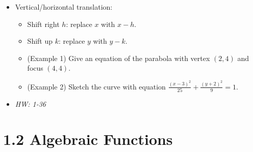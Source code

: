\documentclass[11pt]{article}
\begin{document}
\begin{itemize}
  \item Vertical/horizontal translation:
    \begin{itemize}
      \item Shift right \(h\): replace \(x\) with \(x-h\).
      \item Shift up \(k\): replace \(y\) with \(y-k\).
      \item (Example 1) Give an equation of the parabola with vertex \((2,4)\)
            and focus \((4,4)\).
      \item (Example 2) Sketch the curve with equation
            \(\frac{(x-3)^2}{25}+\frac{(y+2)^2}{9}=1\).
    \end{itemize}
  \item\textit{
    HW: 1-36
  }
\end{itemize}

\section*{1.2 Algebraic Functions}
\end{document}
